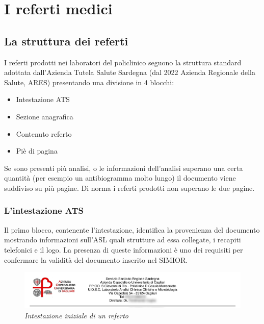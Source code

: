 \chapter{I referti medici}
\section{La struttura dei referti}
I referti prodotti nei laboratori del policlinico seguono la struttura standard adottata dall'Azienda Tutela Salute Sardegna (dal 2022 Azienda Regionale della Salute, ARES) 
presentando una divisione in 4 blocchi:
\begin{center}
	\begin{itemize}
		\item Intestazione ATS\label{sez_h}
		\item Sezione anagrafica\label{sez_an}
		\item Contenuto referto\label{sez_c}
		\item Piè di pagina\label{sez_p}
		\end{itemize}
\end{center}
\par\bigskip
Se sono presenti più analisi, o le informazioni dell'analisi superano una certa quantità (per esempio un antibiogramma molto lungo) il documento viene suddiviso su più pagine.
Di norma i referti prodotti non superano le due pagine.


\newpage
\subsection{L'intestazione ATS}
Il primo blocco, contenente l'intestazione, identifica la provenienza del documento mostrando informazioni sull'ASL quali strutture ad essa collegate, i recapiti telefonici e il logo.
La presenza di queste informazioni è uno dei requisiti per confermare la validità del documento inserito nel SIMIOR.
\begin{figure}[h!]
	\centering
	\includegraphics[width=.99\columnwidth]{images/header.png}
	\caption{\textit{Intestazione iniziale di un referto}}
	\label{fig:header}
\end{figure}
\bigskip
\newline
